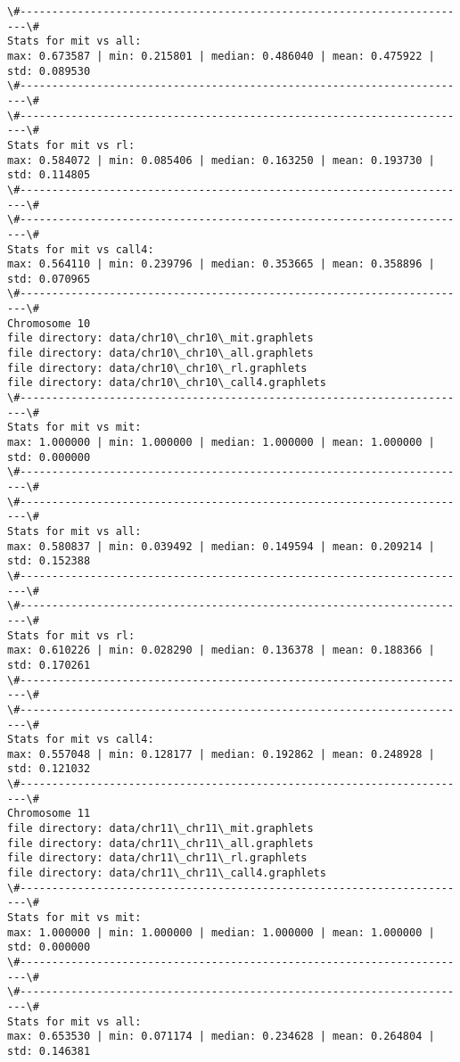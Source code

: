 \documentclass[11pt]{article}
\begin{document}
\begin{Verbatim}[commandchars=\\\{\}]
\#-----------------------------------------------------------------------\#
Stats for mit vs all: 
max: 0.673587 | min: 0.215801 | median: 0.486040 | mean: 0.475922 | std: 0.089530
\#-----------------------------------------------------------------------\#
\#-----------------------------------------------------------------------\#
Stats for mit vs rl: 
max: 0.584072 | min: 0.085406 | median: 0.163250 | mean: 0.193730 | std: 0.114805
\#-----------------------------------------------------------------------\#
\#-----------------------------------------------------------------------\#
Stats for mit vs call4: 
max: 0.564110 | min: 0.239796 | median: 0.353665 | mean: 0.358896 | std: 0.070965
\#-----------------------------------------------------------------------\#
Chromosome 10
file directory: data/chr10\_chr10\_mit.graphlets
file directory: data/chr10\_chr10\_all.graphlets
file directory: data/chr10\_chr10\_rl.graphlets
file directory: data/chr10\_chr10\_call4.graphlets
\#-----------------------------------------------------------------------\#
Stats for mit vs mit: 
max: 1.000000 | min: 1.000000 | median: 1.000000 | mean: 1.000000 | std: 0.000000
\#-----------------------------------------------------------------------\#
\#-----------------------------------------------------------------------\#
Stats for mit vs all: 
max: 0.580837 | min: 0.039492 | median: 0.149594 | mean: 0.209214 | std: 0.152388
\#-----------------------------------------------------------------------\#
\#-----------------------------------------------------------------------\#
Stats for mit vs rl: 
max: 0.610226 | min: 0.028290 | median: 0.136378 | mean: 0.188366 | std: 0.170261
\#-----------------------------------------------------------------------\#
\#-----------------------------------------------------------------------\#
Stats for mit vs call4: 
max: 0.557048 | min: 0.128177 | median: 0.192862 | mean: 0.248928 | std: 0.121032
\#-----------------------------------------------------------------------\#
Chromosome 11
file directory: data/chr11\_chr11\_mit.graphlets
file directory: data/chr11\_chr11\_all.graphlets
file directory: data/chr11\_chr11\_rl.graphlets
file directory: data/chr11\_chr11\_call4.graphlets
\#-----------------------------------------------------------------------\#
Stats for mit vs mit: 
max: 1.000000 | min: 1.000000 | median: 1.000000 | mean: 1.000000 | std: 0.000000
\#-----------------------------------------------------------------------\#
\#-----------------------------------------------------------------------\#
Stats for mit vs all: 
max: 0.653530 | min: 0.071174 | median: 0.234628 | mean: 0.264804 | std: 0.146381

\end{Verbatim}
\end{document}
